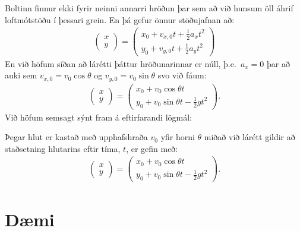 \ifdefined \wholebook \else\documentclass[oneside]{book}\usepackage{EdlBook}\graphicspath{{figures/}}
\begin{document}
Boltinn finnur ekki fyrir neinni annarri hröðun þar sem að við hunsum öll áhrif loftmótstöðu í þessari grein. En þá gefur önnur stöðujafnan að:
\begin{align*}
    \begin{pmatrix} x \\ y \end{pmatrix} = \begin{pmatrix} x_0 + v_{x,0}t +  \frac{1}{2} a_x t^2 \\[2pt] y_0 + v_{y,0}t +  \frac{1}{2} a_y t^2 \end{pmatrix}
\end{align*}
En við höfum síðan að lárétti þáttur hröðunarinnar er núll, þ.e.~$a_x = 0$ þar að auki sem $v_{x,0} = v_0 \cos\theta$ og $v_{y,0} = v_0 \sin\theta$ svo við fáum:
\begin{align*}
    \begin{pmatrix} x \\ y \end{pmatrix} = \begin{pmatrix} x_0 + v_0 \cos\theta t \\[2pt] y_0 + v_0 \sin\theta t -  \frac{1}{2} g t^2 \end{pmatrix}.
\end{align*}
Við höfum semsagt sýnt fram á eftirfarandi lögmál:
\begin{tcolorbox}
\begin{theorem}
Þegar hlut er kastað með upphafshraða $v_0$ yfir horni $\theta$ miðað við lárétt gildir að staðsetning hlutarins eftir tíma, $t$, er gefin með:
\begin{align*}
    \begin{pmatrix} x \\ y \end{pmatrix} = \begin{pmatrix} x_0 + v_0 \cos\theta t \\[2pt] y_0 + v_0 \sin\theta t -  \frac{1}{2} g t^2 \end{pmatrix}.
\end{align*}
\end{theorem}
\end{tcolorbox}

\newpage

\section{Dæmi}
\end{document}
